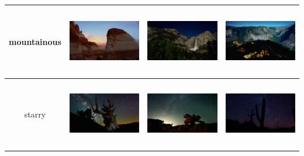\documentclass{article}
\begin{document}
\begin{table}[t]
\begin{tabular}{c c c c}
    		\\
    	\midrule
    	mountainous
    		& \includegraphics[width=4cm,height=3cm]{image/mountainous-1.png}
    		& \includegraphics[width=4cm,height=3cm]{image/mountainous-2.png}
    		& \includegraphics[width=4cm,height=3cm]{image/mountainous-3.png}
    		\\
    	\midrule
    	starry
    		& \includegraphics[width=4cm,height=3cm]{image/starry-1.png}
    		& \includegraphics[width=4cm,height=3cm]{image/starry-2.png}
    		& \includegraphics[width=4cm,height=3cm]{image/starry-3.png}
    		\\
    	\bottomrule
    \end{tabular}
\end{table}
\end{document}

